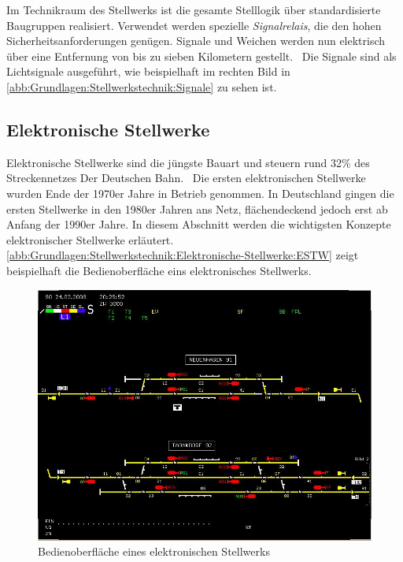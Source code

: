 Im Technikraum des Stellwerks ist die gesamte Stelllogik über standardisierte Baugruppen realisiert. Verwendet werden spezielle \textit{Signalrelais}, die den hohen Sicherheitsanforderungen genügen. Signale und Weichen werden nun elektrisch über eine Entfernung von bis zu sieben Kilometern gestellt.~\cite{bib:DB:Stellwerke} Die Signale sind als Lichtsignale ausgeführt, wie beispielhaft im rechten Bild in \autoref{abb:Grundlagen:Stellwerkstechnik:Signale} zu sehen ist.

\subsection{Elektronische Stellwerke}\label{text:Grundlagen:Stellwerkstechnik:Elektronische-Stellwerke}

Elektronische Stellwerke sind die jüngste Bauart und steuern rund 32\% des Streckennetzes Der Deutschen Bahn.~\cite{bib:DB:Stellwerke} Die ersten elektronischen Stellwerke wurden Ende der 1970er Jahre in Betrieb genommen. In Deutschland gingen die ersten Stellwerke in den 1980er Jahren ans Netz, flächendeckend jedoch erst ab Anfang der 1990er Jahre. In diesem Abschnitt werden die wichtigsten Konzepte elektronischer Stellwerke erläutert. \autoref{abb:Grundlagen:Stellwerkstechnik:Elektronische-Stellwerke:ESTW} zeigt beispielhaft die Bedienoberfläche eins elektronisches Stellwerks.

\begin{figure}[H]
    \centering
    \includegraphics[width=\textwidth]{Assets/Images/2-Grundlagen/ESTW-L-90.png}
    \caption{Bedienoberfläche eines elektronischen Stellwerks}\label{abb:Grundlagen:Stellwerkstechnik:Elektronische-Stellwerke:ESTW-L-90}
\end{figure}

